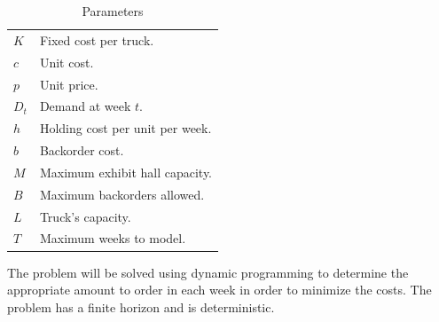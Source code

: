 \documentclass[11pt]{article}
\begin{document}
\begin{table}[ht]
\begin{center}
\begin{tabular}{ll}
$K$ & Fixed cost per truck.\\
$c$ & Unit cost.\\
$p$ & Unit price.\\
$D_t$ & Demand at week $t$.\\
$h$ & Holding cost per unit per week.\\
$b$ & Backorder cost.\\
$M$ & Maximum exhibit hall capacity.\\
$B$ & Maximum backorders allowed.\\
$L$ & Truck's capacity.\\
$T$ & Maximum weeks to model.
\end{tabular}
\caption[\textbf{Parameters:}]{Parameters}
\label{tab:parameters1}
\end{center}
\end{table}

The problem will be solved using dynamic programming to determine the appropriate amount to order in each week in order to minimize the costs. The problem has a finite horizon and is deterministic.
\end{document}

